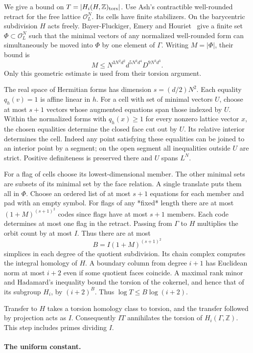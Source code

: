 We give a bound on $T=|H_i(H,\mathbb Z)_{\rm tors}|$. Use Ash's contractible well-rounded retract for the free lattice $\mathcal O_L^N$. Its cells have finite stabilizers. On the barycentric subdivision $H$ acts freely. Bayer-Fluckiger, Emery and Houriet~\cite[\S2.3, Cor.~5.2]{badCells} give a finite set $\Phi\subset\mathcal O_L^N$ such that the minimal vectors of any normalized well-rounded form can simultaneously be moved into $\Phi$ by one element of $\Gamma$. Writing $M=|\Phi|$, their bound is
\[ M\le N^{3N^2d^2}d^{5N^3d^4}D^{9N^3d^3}. \]
Only this geometric estimate is used from their torsion argument.

The real space of Hermitian forms has dimension $s=(d/2)N^2$. Each equality $q_h(v)=1$ is affine linear in $h$. For a cell with set of minimal vectors $U$, choose at most $s+1$ vectors whose augmented equations span those indexed by $U$. Within the normalized forms with $q_h(x)\ge1$ for every nonzero lattice vector $x$, the chosen equalities determine the closed face cut out by $U$. Its relative interior determines the cell. Indeed any point satisfying these equalities can be joined to an interior point by a segment; on the open segment all inequalities outside $U$ are strict. Positive definiteness is preserved there and $U$ spans $L^N$.

For a flag of cells choose its lowest-dimensional member. The other minimal sets are subsets of its minimal set by the face relation. A single translate puts them all in $\Phi$. Choose an ordered list of at most $s+1$ equations for each member and pad with an empty symbol. For flags of any *fixed* length there are at most $(1+M)^{(s+1)^2}$ codes since flags have at most $s+1$ members. Each code determines at most one flag in the retract. Passing from $\Gamma$ to $H$ multiplies the orbit count by at most $I$. Thus there are at most
\[B=I(1+M)^{(s+1)^2}\]
simplices in each degree of the quotient subdivision. Its chain complex computes the integral homology of $H$. A boundary column from degree $i+1$ has Euclidean norm at most $i+2$ even if some quotient faces coincide. A maximal rank minor and Hadamard's inequality bound the torsion of the cokernel, and hence that of its subgroup $H_i$, by $(i+2)^B$. Thus $\log T\le B\log(i+2)$.

Transfer to $H$ takes a torsion homology class to torsion, and the transfer followed by projection acts as $I$. Consequently $IT$ annihilates the torsion of $H_i(\Gamma,\mathbb Z)$. This step includes primes dividing $I$.

\paragraph{The uniform constant.}

